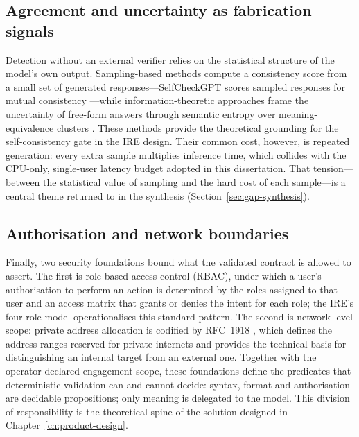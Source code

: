 \subsection*{Agreement and uncertainty as fabrication signals}

Detection without an external verifier relies on the statistical structure of
the model's own output. Sampling-based methods compute a consistency score from
a small set of generated responses---SelfCheckGPT scores sampled responses for
mutual consistency \parencite{manakul2023selfcheckgpt}---while information-theoretic
approaches frame the uncertainty of free-form answers through semantic
entropy over meaning-equivalence clusters \parencite{kuhn2023semantic,
farquhar2024semantic}. These methods provide the theoretical grounding for the
self-consistency gate in the IRE design. Their common cost, however, is
repeated generation: every extra sample multiplies inference time, which
collides with the CPU-only, single-user latency budget adopted in this
dissertation. That tension---between the statistical value of sampling and the
hard cost of each sample---is a central theme returned to in the synthesis
(Section~\ref{sec:gap-synthesis}).

\subsection*{Authorisation and network boundaries}

Finally, two security foundations bound what the validated contract is allowed
to assert. The first is role-based access control (RBAC), under which a user's
authorisation to perform an action is determined by the roles assigned to that
user and an access matrix that grants or denies the intent for each role; the
IRE's four-role model operationalises this standard pattern. The second is
network-level scope: private address allocation is codified by RFC~1918
\parencite{rfc1918}, which defines the address ranges reserved for private
internets and provides the technical basis for distinguishing an internal
target from an external one. Together with the operator-declared engagement
scope, these foundations define the predicates that deterministic validation
can and cannot decide: syntax, format and authorisation are decidable
propositions; only meaning is delegated to the model. This division of
responsibility is the theoretical spine of the solution designed in
Chapter~\ref{ch:product-design}.


